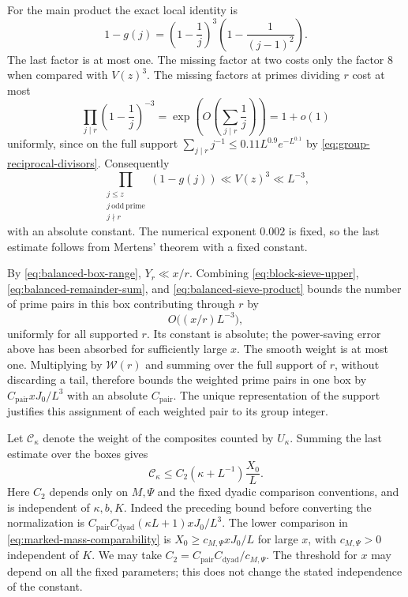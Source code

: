For the main product the exact local identity is
\[
 1-g(j)=\left(1-\frac1j\right)^3
            \left(1-\frac1{(j-1)^2}\right).
\]
The last factor is at most one.  The missing factor at two costs
only the factor $8$ when compared with $V(z)^3$.  The missing
factors at primes dividing $r$ cost at most
\[
 \prod_{j\mid r}\left(1-\frac1j\right)^{-3}
  =\exp\left(O\left(\sum_{j\mid r}\frac1j\right)\right)=1+o(1)
\]
uniformly, since on the full support
$\sum_{j\mid r}j^{-1}\le0.11L^{0.9}e^{-L^{0.1}}$ by
\eqref{eq:group-reciprocal-divisors}.  Consequently
\begin{equation}\label{eq:balanced-sieve-product}
 \prod_{\substack{j\le z\\j\ \mathrm{odd\ prime}\\j\nmid r}}
        (1-g(j))\ll V(z)^3\ll L^{-3},
\end{equation}
with an absolute constant.  The numerical exponent $0.002$ is
fixed, so the last estimate follows from Mertens' theorem with a
fixed constant.

By \eqref{eq:balanced-box-range}, $Y_r\ll x/r$.  Combining
\eqref{eq:block-sieve-upper}, \eqref{eq:balanced-remainder-sum},
and \eqref{eq:balanced-sieve-product} bounds the number of prime
pairs in this box contributing through $r$ by
\[
 O\bigl((x/r)L^{-3}\bigr),
\]
uniformly for all supported $r$.  Its constant is absolute; the
power-saving error above has been absorbed for sufficiently large
$x$.  The smooth weight is at most one.  Multiplying by
$\mathcal W(r)$ and summing over the full support of $r$, without
discarding a tail, therefore bounds the weighted prime pairs in
one box by $C_{\mathrm{pair}}xJ_0/L^3$ with an absolute
$C_{\mathrm{pair}}$.  The unique
representation of the support justifies this assignment of each
weighted pair to its group integer.

Let $\mathcal C_\kappa$ denote the weight of the composites counted by
$U_\kappa$.  Summing the last estimate over the boxes gives
\begin{equation}\label{eq:balanced-composite-mass}
 \mathcal C_\kappa
 \le C_2(\kappa+L^{-1})\frac{X_0}{L}.
\end{equation}
Here $C_2$ depends only on $M,\Psi$ and the fixed dyadic comparison
conventions, and is independent of $\kappa,b,K$.  Indeed the
preceding bound before converting the normalization is
$C_{\mathrm{pair}}C_{\mathrm{dyad}}(\kappa L+1)xJ_0/L^3$.
The lower comparison in \eqref{eq:marked-mass-comparability} is
$X_0\ge c_{M,\Psi}xJ_0/L$ for large $x$, with
$c_{M,\Psi}>0$ independent of $K$.  We may take
$C_2=C_{\mathrm{pair}}C_{\mathrm{dyad}}/c_{M,\Psi}$.  The threshold for $x$ may
depend on all the fixed parameters; this does not change the stated
independence of the constant.

